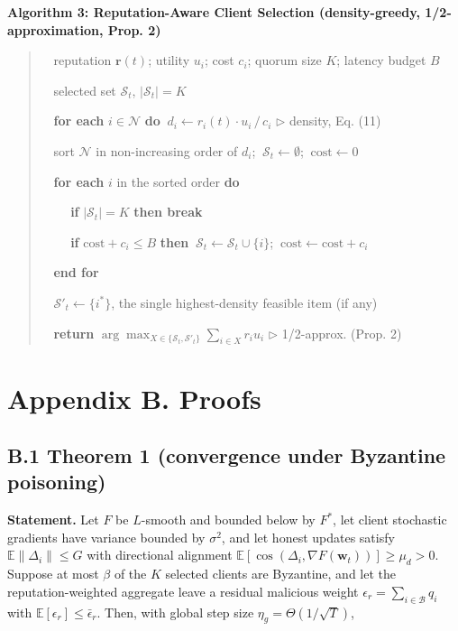 \documentclass[cmc,article,submit,moreauthors,pdftex]{Definitions/tsp}
\begin{document}
\vspace{0.5em}

\noindent\textbf{Algorithm 3: Reputation-Aware Client Selection (density-greedy, 1/2-approximation, Prop. 2)}

\begin{quote}
\noindent{}~ reputation $\mathbf{r}(t)$; utility $u_i$; cost $c_i$; quorum size $K$; latency budget $B$

\noindent{}~ selected set $\mathcal{S}_t$, $\lvert\mathcal{S}_t\rvert = K$

\noindent{}~ \textbf{for each} $i \in \mathcal{N}$ \textbf{do} $\ d_i \leftarrow r_i(t) \cdot u_i \,/\, c_i$  $\triangleright$ density, Eq. (11)

\noindent{}~ sort $\mathcal{N}$ in non-increasing order of $d_i$; $\ \mathcal{S}_t \leftarrow \emptyset$; $\ \mathrm{cost} \leftarrow 0$

\noindent{}~ \textbf{for each} $i$ in the sorted order \textbf{do}

\noindent{}~ $\quad$ \textbf{if} $\lvert\mathcal{S}_t\rvert = K$ \textbf{then break}

\noindent{}~ $\quad$ \textbf{if} $\mathrm{cost} + c_i \leq B$ \textbf{then} $\ \mathcal{S}_t \leftarrow \mathcal{S}_t \cup \{i\}$; $\ \mathrm{cost} \leftarrow \mathrm{cost} + c_i$

\noindent{}~ \textbf{end for}

\noindent{}~ $\mathcal{S}'_t \leftarrow \{i^*\}$, the single highest-density feasible item (if any)

\noindent{}~ \textbf{return} $\arg\max_{X \in \{\mathcal{S}_t, \mathcal{S}'_t\}} \sum_{i \in X} r_i u_i$  $\triangleright$ 1/2-approx. (Prop. 2)
\end{quote}

\section*{Appendix B. Proofs}

\subsection*{B.1 Theorem 1 (convergence under Byzantine poisoning)}

\textbf{Statement.} Let $F$ be $L$-smooth and bounded below by $F^*$, let client stochastic gradients have variance bounded by $\sigma^2$, and let honest updates satisfy $\mathbb{E}\|\Delta_i\| \le G$ with directional alignment $\mathbb{E}[\cos(\Delta_i, \nabla F(\mathbf{w}_t))] \ge \mu_d > 0$. Suppose at most $\beta$ of the $K$ selected clients are Byzantine, and let the reputation-weighted aggregate leave a residual malicious weight $\epsilon_r = \sum_{i \in \mathcal{B}} q_i$ with $\mathbb{E}[\epsilon_r] \le \bar\epsilon_r$. Then, with global step size $\eta_g = \Theta(1/\sqrt{T})$,
\end{document}
